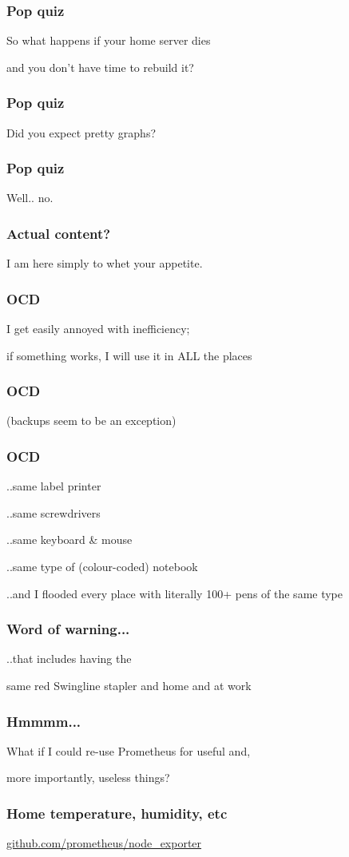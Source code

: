 \documentclass[t]{beamer}
\begin{document}
\begin{frame}
	\frametitle{Pop quiz}
	\vfill
	\centerline{So what happens if your home server dies}
	\centerline{and you don't have time to rebuild it?}
	\vfill
\end{frame}

\begin{frame}
	\frametitle{Pop quiz}
	\vfill
	\centerline{Did you expect pretty graphs?}
	\vfill
\end{frame}

\begin{frame}
	\frametitle{Pop quiz}
	\vfill
	\centerline{Well.. no.}
	\vfill
\end{frame}

\begin{frame}
	\frametitle{Actual content?}
	\vfill
	\centerline{I am here simply to whet your appetite.}
	\vfill
\end{frame}

\begin{frame}
	\frametitle{OCD}
	\vfill
	\centerline{I get easily annoyed with inefficiency;}
	\centerline{if something works, I will use it in ALL the places}
	\vfill
\end{frame}

\begin{frame}
	\frametitle{OCD}
	\vfill
	\centerline{(backups seem to be an exception)}
	\vfill
\end{frame}

\begin{frame}
	\frametitle{OCD}
	\vfill
	\centerline{..same label printer}
	\centerline{..same screwdrivers}
	\centerline{..same keyboard \& mouse}
	\centerline{..same type of (colour-coded) notebook}
	\vfill
	\centerline{..and I flooded every place with literally 100+ pens of the same type}
	\vfill
\end{frame}

\begin{frame}
	\frametitle{Word of warning...}
	\vfill
	\centerline{..that includes having the}
	\centerline{same red Swingline stapler and home and at work}
	\vfill
\end{frame}


\begin{frame}
	\frametitle{Hmmmm...}
	\vfill
	\centerline{What if I could re-use Prometheus for useful and,}
	\centerline{more importantly, useless things?}
	\vfill
\end{frame}


\begin{frame}
	\frametitle{Home temperature, humidity, etc}
	\vfill
	\centerline{\url{github.com/prometheus/node_exporter}}
	\vfill
\end{frame}
\end{document}
